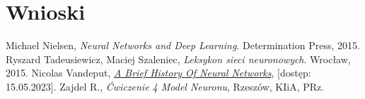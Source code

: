 \documentclass{article}
\begin{document}
\section{Wnioski}
\begin{thebibliography}{9}
    Michael Nielsen,
    \emph{Neural Networks and Deep Learning}.
    Determination Press,
    2015.
    Ryszard Tadeusiewicz, Maciej Szaleniec,
    \emph{Leksykon sieci neuronowych}.
    Wrocław,
    2015.
    Nicolas Vandeput,
    \href{https://medium.com/analytics-vidhya/a-brief-history-of-neural-networks-c234639a43f1}{\emph{A Brief History Of Neural Networks}},
    [dostęp: 15.05.2023].
    Zajdel R.,
    \emph{Ćwiczenie 4 Model Neuronu},
    Rzeszów,
    KIiA, PRz.
\end{thebibliography}
\end{document}
